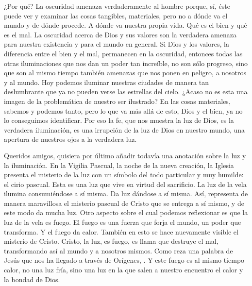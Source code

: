 \begin{body}
¿Por qué? La oscuridad amenaza verdaderamente al hombre porque, sí, éste puede ver y examinar las cosas tangibles, materiales, pero no a dónde va el mundo y de dónde procede. A dónde va nuestra propia vida. Qué es el bien y qué es el mal. La oscuridad acerca de Dios y sus valores son la verdadera amenaza para nuestra existencia y para el mundo en general. Si Dios y los valores, la diferencia entre el bien y el mal, permanecen en la oscuridad, entonces todas las otras iluminaciones que nos dan un poder tan increíble, no son sólo progreso, sino que son al mismo tiempo también amenazas que nos ponen en peligro, a nosotros y al mundo. Hoy podemos iluminar nuestras ciudades de manera tan deslumbrante que ya no pueden verse las estrellas del cielo. ¿Acaso no es esta una imagen de la problemática de nuestro ser ilustrado? En las cosas materiales, sabemos y podemos tanto, pero lo que va más allá de esto, Dios y el bien, ya no lo conseguimos identificar. Por eso la fe, que nos muestra la luz de Dios, es la verdadera iluminación, es una irrupción de la luz de Dios en nuestro mundo, una apertura de nuestros ojos a la verdadera luz.

Queridos amigos, quisiera por último añadir todavía una anotación sobre la luz y la iluminación. En la Vigilia Pascual, la noche de la nueva creación, la Iglesia presenta el misterio de la luz con un símbolo del todo particular y muy humilde: el cirio pascual. Esta es una luz que vive en virtud del sacrificio. La luz de la vela ilumina consumiéndose a sí misma. Da luz dándose a sí misma. Así, representa de manera maravillosa el misterio pascual de Cristo que se entrega a sí mismo, y de este modo da mucha luz. Otro aspecto sobre el cual podemos reflexionar es que la luz de la vela es fuego. El fuego es una fuerza que forja el mundo, un poder que transforma. Y el fuego da calor. También en esto se hace nuevamente visible el misterio de Cristo. Cristo, la luz, es fuego, es llama que destruye el mal, transformando así al mundo y a nosotros mismos. Como reza una palabra de Jesús que nos ha llegado a través de Orígenes, . Y este fuego es al mismo tiempo calor, no una luz fría, sino una luz en la que salen a nuestro encuentro el calor y la bondad de Dios.


\end{body}
